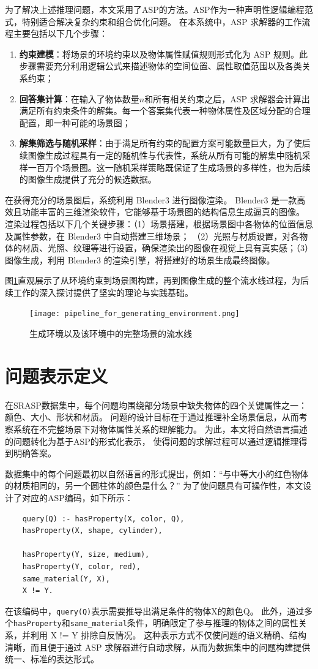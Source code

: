 为了解决上述推理问题，本文采用了ASP的方法。ASP作为一种声明性逻辑编程范式，特别适合解决复杂约束和组合优化问题。
在本系统中，ASP 求解器的工作流程主要包括以下几个步骤：
\begin{enumerate}[itemsep=0pt,parsep=0pt]
\item \textbf{约束建模}：将场景的环境约束以及物体属性赋值规则形式化为 ASP 规则。此步骤需要充分利用逻辑公式来描述物体的空间位置、属性取值范围以及各类关系约束；
\item \textbf{回答集计算}：在输入了物体数量$n$和所有相关约束之后，ASP 求解器会计算出满足所有约束条件的解集。每一个答案集代表一种物体属性及区域分配的合理配置，即一种可能的场景图；
\item \textbf{解集筛选与随机采样}：由于满足所有约束的配置方案可能数量巨大，为了使后续图像生成过程具有一定的随机性与代表性，系统从所有可能的解集中随机采样一百万个场景图。这一随机采样策略既保证了生成场景的多样性，也为后续的图像生成提供了充分的候选数据。
\end{enumerate}

在获得充分的场景图后，系统利用 Blender3 进行图像渲染。
Blender3 是一款高效且功能丰富的三维渲染软件，它能够基于场景图的结构信息生成逼真的图像。
渲染过程包括以下几个关键步骤：（1）场景搭建，根据场景图中各物体的位置信息及属性参数，在 Blender3 中自动搭建三维场景；
（2）光照与材质设置，对各物体的材质、光照、纹理等进行设置，确保渲染出的图像在视觉上具有真实感；（3）
图像生成，利用 Blender3 的渲染引擎，将搭建好的场景生成最终图像。

图\ref{pipeline_for_generating_environment}直观展示了从环境约束到场景图构建，再到图像生成的整个流水线过程，为后续工作的深入探讨提供了坚实的理论与实践基础。
\begin{figure}
    \centering
    \texttt{[image: pipeline\_for\_generating\_environment.png]}
    \caption{生成环境以及该环境中的完整场景的流水线}
    \label{pipeline_for_generating_environment}
\end{figure}
\section{问题表示定义}
在SRASP数据集中，每个问题均围绕部分场景中缺失物体的四个关键属性之一：颜色、大小、形状和材质。
问题的设计目标在于通过推理补全场景信息，从而考察系统在不完整场景下对物体属性关系的理解能力。
为此，本文将自然语言描述的问题转化为基于ASP的形式化表示，
使得问题的求解过程可以通过逻辑推理得到明确答案。

数据集中的每个问题最初以自然语言的形式提出，例如：“与中等大小的红色物体的材质相同的，另一个圆柱体的颜色是什么？”
为了使问题具有可操作性，本文设计了对应的ASP编码，如下所示：
\begin{lstlisting}
    query(Q) :- hasProperty(X, color, Q),
    hasProperty(X, shape, cylinder),

    hasProperty(Y, size, medium),
    hasProperty(Y, color, red),
    same_material(Y, X),
    X != Y.
\end{lstlisting}
在该编码中，\texttt{query(Q)}表示需要推导出满足条件的物体X的颜色Q。
此外，通过多个\texttt{hasProperty}和\texttt{same\_material}条件，明确限定了参与推理的物体之间的属性关系，并利用 X != Y 排除自反情况。
这种表示方式不仅使问题的语义精确、结构清晰，而且便于通过 ASP 求解器进行自动求解，从而为数据集中的问题构建提供统一、标准的表达形式。

